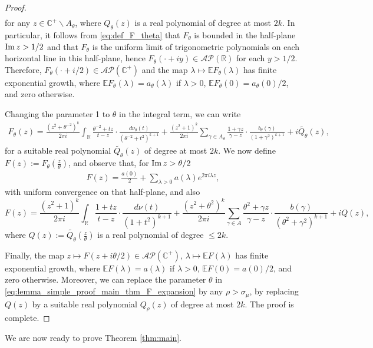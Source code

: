 \documentclass[a4paper,reqno,12pt]{amsart}
\newcommand{\A}{\mathcal{A}}
\renewcommand{\P}{\mathcal{P}}
\renewcommand{\r}{\mathbb{R}}
\newcommand{\cp}{\mathbb{C}} %
\newcommand{\im}{{\rm Im}\,}
\newcommand{\la}{\lambda}
\newcommand{\ga}{\gamma}
\newcommand{\si}{\sigma}
\newcommand{\cd}{\cdot}
\newcommand{\1}{{\bf 1}}
\newcommand{\e}{\mathbb{E}}
\newcommand{\mt}{\mapsto}
\renewcommand{\Im}{{\rm Im}\,}
\begin{document}
\begin{proof}
\begin{align*}
\end{align*}
for any $z\in\cp^+\backslash A_\theta$, where $Q_\theta(z)$ is a real polynomial of degree at most $2k$. In particular, it follows from \eqref{eq:def_F_theta} that $F_\theta$ is bounded in the half-plane $\Im{z}>1/2$ and that $F_\theta$ is the uniform limit of trigonometric polynomials on each horizontal line in this half-plane, hence $F_\theta(\cd+iy)\in\A\P(\r)$ for each $y>1/2$. Therefore, $F_\theta(\cd+i/2)\in\A\P(\cp^+)$ and the map $\la\mt\e F_\theta(\la)$ has finite exponential growth, where $\e F_\theta(\la)=a_\theta(\la)$ if $\la>0$, $\e F_\theta(0)=a_\theta(0)/2$, and zero otherwise.

Changing the parameter 1 to $\theta$ in the integral term, we can write 
\begin{align*}
    F_\theta(z)=\frac{(z^2+\theta^{-2})^k}{2\pi i} \int_{\r} \frac{\theta^{-2}+tz}{t-z}\cd\frac{d\nu_\theta(t)}{(\theta^{-2}+t^2)^{k+1}}+\frac{(z^2+1)^k}{2\pi i} \sum_{\ga\in A_\theta} \frac{1+\ga z}{\ga-z}\cd\frac{b_\theta(\ga)}{(1+\ga^2)^{k+1}}+i\widetilde{Q_\theta}(z),
\end{align*}
for a suitable real polynomial $\widetilde{Q_\theta}(z)$ of degree at most $2k$.
We now define $F(z):=F_\theta\left(\frac{z}{\theta}\right)$, and observe that, for $\im{z}>\theta/2$
\begin{align*}
    F(z)=\frac{a(0)}{2}+\sum_{\la>0} a(\la)e^{2\pi i\la z},
\end{align*}
with uniform convergence on that half-plane, and also
\begin{equation}
\label{eq:lemma_simple_proof_main_thm_F_expansion}
    F(z)=\frac{(z^2+1)^k}{2\pi i} \int_{\r} \frac{1+tz}{t-z}\cd\frac{d\nu(t)}{(1+t^2)^{k+1}}+\frac{(z^2+\theta^2)^k}{2\pi i} \sum_{\ga\in A} \frac{\theta^2+\ga z}{\ga-z}\cd\frac{b(\ga)}{(\theta^2+\ga^2)^{k+1}}+iQ(z),
\end{equation}
where $Q(z):=\widetilde{Q_\theta}\left(\frac{z}{\theta}\right)$ is a real polynomial of degree $\leq 2k$.

Finally, the map $z\mt F(z+i\theta/2)\in\A\P(\cp^+)$, $\la\mt\e F(\la)$ has finite exponential growth, where $\e F(\la)=a(\la)$ if $\la>0$, $\e F(0)=a(0)/2$, and zero otherwise. Moreover, we can replace the parameter $\theta$ in \eqref{eq:lemma_simple_proof_main_thm_F_expansion} by any $\rho>\si_\mu$, by replacing $Q(z)$ by a suitable real polynomial $Q_\rho(z)$ of degree at most $2k$. The proof is complete.
\end{proof}
We are now ready to prove Theorem \ref{thm:main}.
\end{document}

